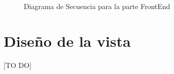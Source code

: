 \begin{figure}[H]
\caption{Diagrama de Secuencia para la parte FrontEnd}
\end{figure}

\section{Diseño de la vista}

[TO DO]

